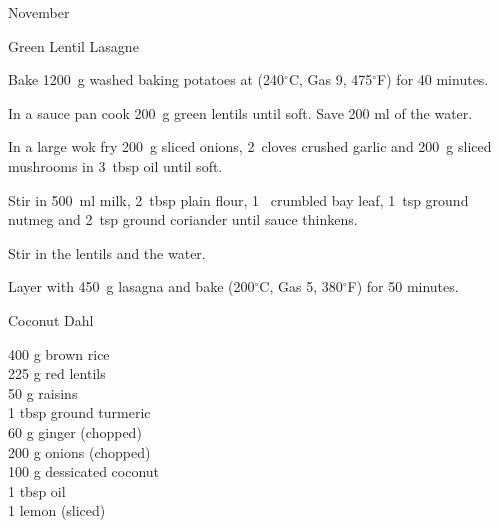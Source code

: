 \begin{menu}{November}
\begin{recipe}{2}{Green Lentil Lasagne}
    \begin{instructions}
    \item 
    Bake
    1200~g washed baking potatoes
    at
    (240$^{\circ}$C, Gas 9, 475$^{\circ}$F) for 40 minutes.
  \item 
        In a sauce pan cook
        200~g  green lentils
        until soft.
        Save 200 ml of the water.
      \item 
        In a large wok fry
        200~g sliced onions,
        2~cloves crushed garlic
        and
        200~g sliced mushrooms
        in
        3~tbsp  oil
        until soft.
      \item 
        Stir in
        500~ml  milk,
        2~tbsp  plain flour,
        1~ crumbled bay leaf,
        1~tsp  ground nutmeg
        and
        2~tsp  ground coriander
        until sauce thinkens.
      \item 
        Stir in
        the lentils
        and
        the water.
      \item 
        Layer with
        450~g  lasagna
        and bake (200$^{\circ}$C, Gas 5, 380$^{\circ}$F) for 50 minutes.
      
    \end{instructions}
    \end{recipe}%
  
    \begin{recipe}{2}{Coconut Dahl}%
		\begin{ingredients}
		400 g brown rice  \\
	225 g red lentils  \\
	50 g raisins  \\
	1 tbsp ground turmeric  \\
	60 g ginger (chopped) \\
	200 g onions (chopped) \\
	100 g dessicated coconut  \\
	1 tbsp oil  \\
	1  lemon (sliced) \\
	
		\end{ingredients}
	
	
	

\end{recipe}
\end{menu}
